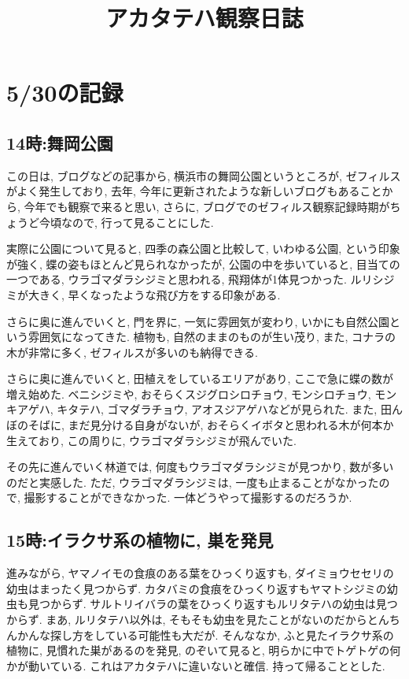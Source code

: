 \documentclass{jsarticle}
\title{アカタテハ観察日誌}
\begin{document}
\maketitle

\section{5/30の記録}
\subsection{14時:舞岡公園}
この日は, ブログなどの記事から, 横浜市の舞岡公園というところが, ゼフィルスがよく発生しており, 
去年, 今年に更新されたような新しいブログもあることから, 今年でも観察で来ると思い, 
さらに, ブログでのゼフィルス観察記録時期がちょうど今頃なので, 行って見ることにした. 

実際に公園について見ると, 四季の森公園と比較して, いわゆる公園, という印象が強く, 蝶の姿もほとんど見られなかったが, 
公園の中を歩いていると, 目当ての一つである, ウラゴマダラシジミと思われる, 飛翔体が1体見つかった. 
ルリシジミが大きく, 早くなったような飛び方をする印象がある. 

さらに奥に進んでいくと, 門を界に, 一気に雰囲気が変わり, いかにも自然公園という雰囲気になってきた. 
植物も, 自然のままのものが生い茂り, また, コナラの木が非常に多く, ゼフィルスが多いのも納得できる. 

さらに奥に進んでいくと, 田植えをしているエリアがあり, ここで急に蝶の数が増え始めた. 
ベニシジミや, おそらくスジグロシロチョウ, モンシロチョウ, モンキアゲハ, キタテハ, ゴマダラチョウ, アオスジアゲハなどが見られた. 
また, 田んぼのそばに, まだ見分ける自身がないが, おそらくイボタと思われる木が何本か生えており, この周りに, ウラゴマダラシジミが飛んでいた. 

その先に進んでいく林道では, 何度もウラゴマダラシジミが見つかり, 数が多いのだと実感した. 
ただ, ウラゴマダラシジミは, 一度も止まることがなかったので, 撮影することができなかった. 一体どうやって撮影するのだろうか. 

\subsection{15時:イラクサ系の植物に, 巣を発見}
進みながら, ヤマノイモの食痕のある葉をひっくり返すも, ダイミョウセセリの幼虫はまったく見つからず. 
カタバミの食痕をひっくり返すもヤマトシジミの幼虫も見つからず. サルトリイバラの葉をひっくり返すもルリタテハの幼虫は見つからず. まあ, ルリタテハ以外は, そもそも幼虫を見たことがないのだからとんちんかんな探し方をしている可能性も大だが. 
そんななか, ふと見たイラクサ系の植物に, 見慣れた巣があるのを発見, のぞいて見ると, 明らかに中でトゲトゲの何かが動いている. 
これはアカタテハに違いないと確信. 持って帰ることとした. 
\end{document}
